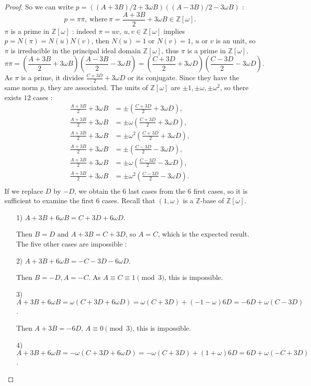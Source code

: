 \documentclass[11pt,a4paper]{article}
\newcommand{\Z}{\mathbb{Z}}
\begin{document}
{\begin{proof}
So we can write $p = ((A+3B)/2 + 3\omega B)((A-3B)/2 - 3\omega B)$ :
$$p = \pi \overline{\pi},\ \mathrm{where}\ \pi = \frac{A+3B}{2} + 3\omega B \in \Z[\omega].$$
$\pi$ is a prime in $\Z[\omega]$ : indeed $\pi = uv,\ u,v \in \Z[\omega]$ implies $p = N(\pi) = N(u)N(v)$, then $N(u) = 1$ or $N(v) = 1$, $u$ or $v$ is an unit, so $\pi$ is irreducible in the principal ideal domain $\Z[\omega]$, thus $\pi$ is a prime in $\Z[\omega]$.
$$\pi \overline{\pi} = \left(\frac{A+3B}{2} + 3\omega B\right)\left(\frac{A-3B}{2} - 3\omega B\right)=\left(\frac{C+3D}{2} + 3\omega D\right)\left(\frac{C-3D}{2} - 3\omega D\right).$$
As $\pi$ is a prime, it divides $\frac{C+3D}{2} + 3\omega D$ or its conjugate. Since they have the same norm $p$, they are associated. The units of $\Z[\omega]$ are $\pm1,\pm \omega,\pm \omega^2$, so there exists $12$ cases :
\begin{align*}
\frac{A+3B}{2} + 3\omega B &= \pm \left(\frac{C+3D}{2} + 3\omega D\right),\\
\frac{A+3B}{2} + 3\omega B &= \pm \omega \left(\frac{C+3D}{2} + 3\omega D\right),\\
\frac{A+3B}{2} + 3\omega B &= \pm \omega^2\left(\frac{C+3D}{2} + 3\omega D\right),\\
\frac{A+3B}{2} + 3\omega B &= \pm \left(\frac{C-3D}{2} - 3\omega D\right),\\
\frac{A+3B}{2} + 3\omega B &= \pm \omega \left(\frac{C-3D}{2} - 3\omega D\right),\\
\frac{A+3B}{2} + 3\omega B &= \pm \omega^2\left(\frac{C-3D}{2} - 3\omega D\right).\\
\end{align*}
If we replace $D$ by $-D$, we obtain the 6 last cases from the 6 first cases, so it is sufficient to examine the first 6 cases. Recall that $(1,\omega)$ is a $\Z$-base of $\Z[\omega]$.
\begin{enumerate}
\item[1)] $A + 3B + 6\omega B = C + 3D + 6\omega D$.

Then $B = D$ and $A+3B = C + 3D$, so $A = C$, which is the expected result.
The five other cases are impossible :
\item[2)] $A+3B + 6\omega B = -C-3D -6\omega D$.

Then $B = -D, A = -C$. As $A\equiv C \equiv 1 \pmod 3$, this is impossible.
\item[3)] $A + 3 B + 6\omega B = \omega(C+3D+6\omega D) = \omega(C+3D) + (-1 - \omega) 6 D = -6D + \omega(C-3D)$.

Then $A+3B = - 6 D$, $A \equiv 0 \pmod 3$, this is impossible.
\item[4)] $A+3B + 6 \omega B = -\omega (C+3D+6\omega D) = -\omega (C+3D) + (1+\omega) 6D = 6D + \omega(-C+3D)$.


\end{enumerate}
\end{proof}}
\end{document}
